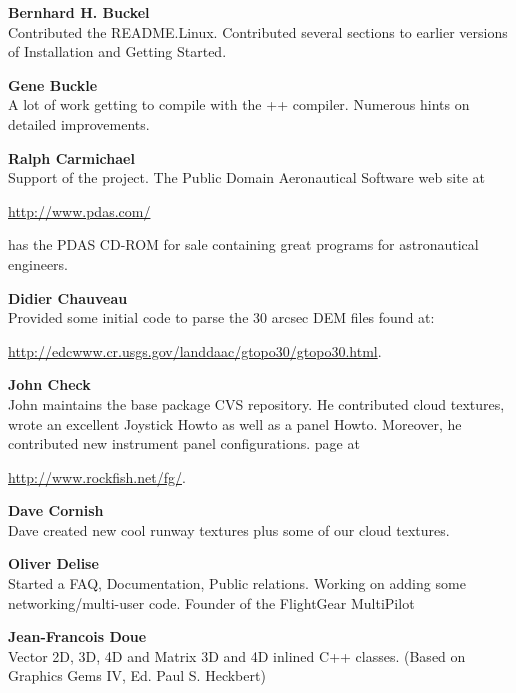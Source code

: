 \noindent \textbf{Bernhard H. Buckel}\\
  Contributed the README.Linux.  Contributed several sections to earlier versions of
 Installation and Getting Started.
 \medskip

\noindent \textbf{Gene Buckle}\\
  A lot of work getting \FlightGear{} to compile with the ++
  compiler. Numerous hints on detailed improvements.
 \medskip


\noindent \textbf{Ralph Carmichael}\\
  Support of the project. The Public Domain Aeronautical Software web site at
\medskip

\href{http://www.pdas.com/}{http://www.pdas.com/}
 \medskip

 \noindent
 has the PDAS CD-ROM for sale containing great programs for astronautical engineers.

\noindent \textbf{Didier Chauveau}\\
  Provided some initial code to parse the 30 arcsec DEM files found at:
   \medskip

  \href{http://edcwww.cr.usgs.gov/landdaac/gtopo30/gtopo30.html}{http://edcwww.cr.usgs.gov/landdaac/gtopo30/gtopo30.html}.
 \medskip

\noindent \textbf{John Check}\\
 John maintains the base package CVS repository. He contributed cloud textures, wrote an excellent Joystick Howto as well as a panel Howto. Moreover, he contributed new instrument panel configurations. \FlightGear{}
 page at
 \medskip

 \href{http://www.rockfish.net/fg/}{http://www.rockfish.net/fg/}.
 \medskip

\noindent \textbf{Dave Cornish}\\
 Dave created new cool runway textures plus some of our cloud textures.
 \medskip

\noindent \textbf{Oliver Delise} \\
 Started a FAQ, Documentation, Public relations. Working on adding some
  networking/multi-user code. Founder of the FlightGear MultiPilot
\medskip

\noindent \textbf{Jean-Francois Doue}\\
  Vector 2D, 3D, 4D and Matrix 3D and 4D inlined C++ classes.  (Based on
  Graphics Gems IV, Ed. Paul S. Heckbert)
  \medskip

